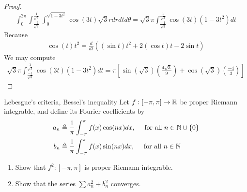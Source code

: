 \documentclass{report}
\begin{document}
\begin{proof}
\begin{align*}
 \int_0^{2\pi } \int^{\frac{1}{\sqrt{3} }}_{\frac{-1}{\sqrt{3} }} \int_0^{\sqrt{1-3t^2} } \cos (3t) \sqrt{3}r dr dt d\theta   = \sqrt{3} \pi  \int^{\frac{1}{\sqrt{3} }}_{\frac{-1}{\sqrt{3} }} \cos (3t) (1-3t^2) dt
\end{align*}
Because 
\begin{align*}
\cos (t)t^2 = \frac{d}{dt}\left( (\sin t) t^2 + 2 (\cos t)t - 2 \sin t \right)
\end{align*}
We may compute 
\begin{align*}
 \sqrt{3} \pi  \int^{\frac{1}{\sqrt{3} }}_{\frac{-1}{\sqrt{3} }} \cos (3t) (1-3t^2) dt = \pi  \left[\sin (\sqrt{3} ) \left(\frac{4\sqrt{3} }{9} \right)+\cos (\sqrt{3} )\left(\frac{-4}{3} \right) \right]
\end{align*}
\end{proof}
\begin{question}{Lebesgue's criteria, Bessel's inequality}{}
Let $f:[-\pi ,\pi ]\rightarrow \mathbb{R}$ be proper Riemann integrable, and define its Fourier coefficients by 
\begin{align*}
  a_n&\triangleq \frac{1}{\pi }\int_{-\pi }^{\pi } f(x)\cos (nx)dx,\quad \text{ for all }n \in \mathbb{N} \cup  \left\{ 0 \right\} \\
  b_n &\triangleq \frac{1}{\pi }\int_{-\pi }^{\pi }f(x)\sin (nx)dx,\quad \text{ for all }n\in\mathbb{N}
\end{align*}
\begin{enumerate}[label=(\roman*)]
  \item Show that $f^2:[-\pi ,\pi ]$ is proper Riemann integrable. 
  \item Show that the series $\sum a_n^2 +b_n^2$ converges. 
\end{enumerate}
\end{question}
\end{document}
